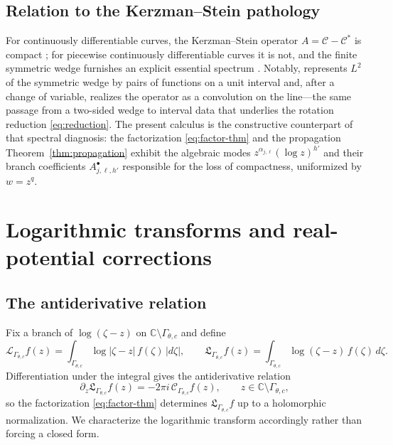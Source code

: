 \documentclass[pdflatex,sn-mathphys-num]{sn-jnl}%
\newcommand{\C}{\mathbb{C}}
\newcommand{\Cau}{\mathcal{C}}
\newcommand{\Lop}{\mathcal{L}}
\newcommand{\Lcx}{\mathfrak{L}}
\newcommand{\Gw}{\Gamma_{\theta,c}}
\theoremstyle{thmstyleone}
\theoremstyle{thmstyletwo}
\theoremstyle{thmstylethree}
\begin{document}
\subsection{Relation to the Kerzman--Stein pathology}
For continuously differentiable curves, the Kerzman--Stein operator
$A=\Cau-\Cau^{*}$ is compact \cite{kerzman1978cauchy}; for piecewise
continuously differentiable curves it is not, and the finite symmetric wedge
furnishes an explicit essential spectrum \cite{bolt2015kerzman}. Notably,
\cite{bolt2015kerzman} represents $L^{2}$ of the symmetric wedge by pairs of functions
on a unit interval and, after a change of variable, realizes the operator as a
convolution on the line---the same passage from a two-sided wedge to interval
data that underlies the rotation reduction \eqref{eq:reduction}. The present
calculus is the constructive counterpart of that spectral diagnosis: the
factorization \eqref{eq:factor-thm} and the propagation
Theorem~\ref{thm:propagation} exhibit the algebraic modes
$z^{\alpha_{j,\ell}}(\log z)^{h'}$ and their branch coefficients
$A^{\bullet}_{j,\ell,h'}$ responsible for the loss of compactness, uniformized
by $w=z^{q}$.

\section{Logarithmic transforms and real-potential corrections}
\label{sec:log}

\subsection{The antiderivative relation}
Fix a branch of $\log(\zeta-z)$ on $\C\setminus\Gw$ and define
\begin{equation}\label{eq:log-defs}
  \Lop_{\Gw}f(z)=\int_{\Gw}\log|\zeta-z|\,f(\zeta)\,|d\zeta|,
  \qquad
  \Lcx_{\Gw}f(z)=\int_{\Gw}\log(\zeta-z)\,f(\zeta)\,d\zeta .
\end{equation}
Differentiation under the integral gives the antiderivative relation
\begin{equation}\label{eq:antideriv}
  \partial_z\Lcx_{\Gw}f(z)=-2\pi i\,\Cau_{\Gw}f(z),
  \qquad z\in\C\setminus\Gw,
\end{equation}
so the factorization \eqref{eq:factor-thm} determines $\Lcx_{\Gw}f$ up to a
holomorphic normalization. We characterize the logarithmic transform
accordingly rather than forcing a closed form.
\end{document}

